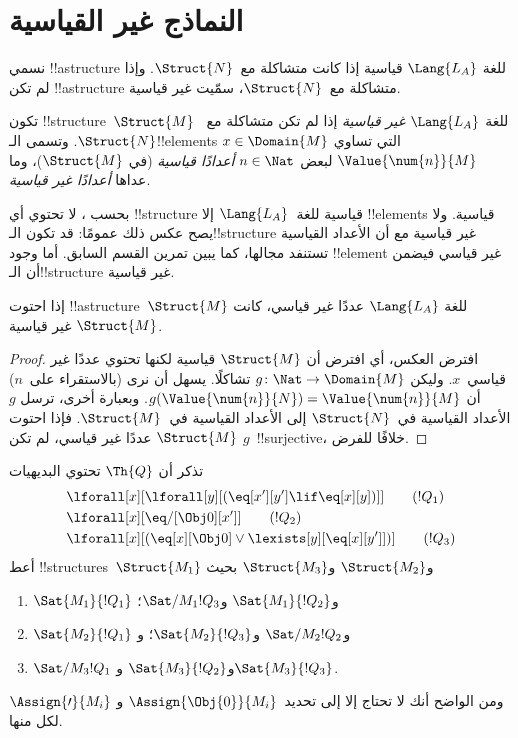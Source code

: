 \documentclass[../../../include/open-logic-section]{subfiles}
\begin{document}
\section{النماذج غير القياسية}

\begin{explain}
نسمي !!a{structure} للغة $\Lang{L_A}$ قياسية إذا كانت متشاكلة
مع~$\Struct{N}$. وإذا لم تكن !!a{structure} متشاكلة مع~$\Struct{N}$،
سمّيت غير قياسية.
\end{explain}

\begin{defn}
تكون !!{structure}~$\Struct{M}$ للغة $\Lang{L_A}$ \emph{غير قياسية}
إذا لم تكن متشاكلة مع~$\Struct{N}$. وتسمى الـ!!{element}s
$x \in \Domain{M}$ التي تساوي $\Value{\num{n}}{M}$ لبعض
$n \in \Nat$ \emph{أعدادًا قياسية} (في $\Struct{M}$)، وما عداها
\emph{أعدادًا غير قياسية}.
\end{defn}

\begin{explain}
بحسب ، لا تحتوي أي !!{structure} قياسية
للغة~$\Lang{L_A}$ إلا !!{element}s قياسية. ولا يصح عكس ذلك عمومًا: قد
تكون الـ!!{structure} غير قياسية مع أن الأعداد القياسية تستنفد مجالها،
كما يبين تمرين القسم السابق. أما وجود !!{element} غير قياسي فيضمن أن
الـ!!{structure} غير قياسية.
\end{explain}

\begin{prop}
إذا احتوت !!a{structure}~$\Struct{M}$ للغة $\Lang{L_A}$ عددًا غير
قياسي، كانت $\Struct{M}$ غير قياسية.
\end{prop}

\begin{proof}
افترض العكس، أي افترض أن $\Struct{M}$ قياسية لكنها تحتوي عددًا غير
قياسي~$x$. وليكن $g\colon \Nat \to \Domain{M}$ تشاكلًا. يسهل أن نرى
(بالاستقراء على~$n$) أن
$g(\Value{\num{n}}{N})=\Value{\num{n}}{M}$. وبعبارة أخرى، ترسل $g$
الأعداد القياسية في~$\Struct{N}$ إلى الأعداد القياسية في~$\Struct{M}$.
فإذا احتوت $\Struct{M}$ عددًا غير قياسي، لم تكن $g$~!!{surjective}،
خلافًا للفرض.
\end{proof}

\begin{prob}
تذكر أن $\Th{Q}$ تحتوي البديهيات
\begin{align*}
& \lforall[x][\lforall[y][(\eq[x'][y'] \lif \eq[x][y])]] \tag{$!Q_1$}\\
& \lforall[x][\eq/[\Obj 0][x']] \tag{$!Q_2$}\\
& \lforall[x][(\eq[x][\Obj 0] \lor \lexists[y][\eq[x][y']])] \tag{$!Q_3$}
\end{align*}
أعط !!{structure}s~$\Struct{M_1}$ و$\Struct{M_2}$ و$\Struct{M_3}$ بحيث
\begin{enumerate}
\item $\Sat{M_1}{!Q_1}$ و$\Sat{M_1}{!Q_2}$ و$\Sat/{M_1}{!Q_3}$؛
\item $\Sat{M_2}{!Q_1}$ و$\Sat/{M_2}{!Q_2}$ و$\Sat{M_2}{!Q_3}$؛ و
\item $\Sat/{M_3}{!Q_1}$ و$\Sat{M_3}{!Q_2}$ و$\Sat{M_3}{!Q_3}$.
\end{enumerate}
ومن الواضح أنك لا تحتاج إلا إلى تحديد~$\Assign{\Obj{0}}{M_i}$ و
$\Assign{\prime}{M_i}$ لكل منها.
\end{prob}
\end{document}
